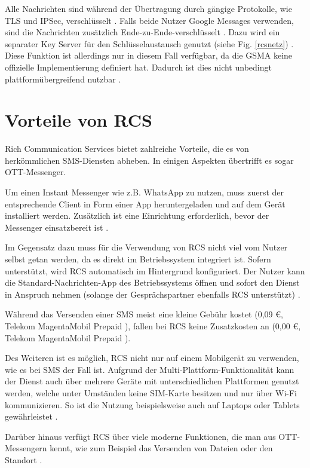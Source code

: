 \documentclass[conference]{IEEEtran}
\begin{document}
Alle Nachrichten sind während der Übertragung durch gängige Protokolle, wie TLS und IPSec, verschlüsselt \cite{uniprof}.
Falls beide Nutzer Google Messages verwenden, sind die Nachrichten zusätzlich Ende-zu-Ende-verschlüsselt \cite{googlemessagessecure}.
Dazu wird ein separater Key Server für den Schlüsselaustausch genutzt (siehe Fig. \ref{rcsnetz}) \cite{5gmsg}.
Diese Funktion ist allerdings nur in diesem Fall verfügbar, da die GSMA keine offizielle Implementierung definiert hat.
Dadurch ist dies nicht unbedingt plattformübergreifend nutzbar \cite{googlemessagessecure}.


\section{Vorteile von RCS}

Rich Communication Services bietet zahlreiche Vorteile, die es von herkömmlichen SMS-Diensten abheben.
In einigen Aspekten übertrifft es sogar OTT-Messenger.

Um einen Instant Messenger wie z.B. WhatsApp zu nutzen, muss zuerst der entsprechende Client in Form einer App heruntergeladen und auf dem Gerät installiert werden.
Zusätzlich ist eine Einrichtung erforderlich, bevor der Messenger einsatzbereit ist \cite{5gmsg,rcsmno}.

Im Gegensatz dazu muss für die Verwendung von RCS nicht viel vom Nutzer selbst getan werden, da es direkt im Betriebssystem integriert ist.
Sofern unterstützt, wird RCS automatisch im Hintergrund konfiguriert.
Der Nutzer kann die Standard-Nachrichten-App des Betriebssystems öffnen und sofort den Dienst in Anspruch nehmen (solange der Gesprächspartner ebenfalls RCS unterstützt) \cite{5gmsg,rcsmno}.

Während das Versenden einer SMS meist eine kleine Gebühr kostet (0,09 €, Telekom MagentaMobil Prepaid \cite{telekomsms}), fallen bei RCS keine Zusatzkosten an (0,00 €, Telekom MagentaMobil Prepaid \cite{telekomrcs}).

Des Weiteren ist es möglich, RCS nicht nur auf einem Mobilgerät zu verwenden, wie es bei SMS der Fall ist.
Aufgrund der Multi-Plattform-Funktionalität kann der Dienst auch über mehrere Geräte mit unterschiedlichen Plattformen genutzt werden, welche unter Umständen keine SIM-Karte besitzen und nur über Wi-Fi kommunizieren.
So ist die Nutzung beispielsweise auch auf Laptops oder Tablets gewährleistet \cite{rcsmno,uniprof}.

Darüber hinaus verfügt RCS über viele moderne Funktionen, die man aus OTT-Messengern kennt, wie zum Beispiel das Versenden von Dateien oder den Standort \cite{wafaq,uniprof}.
\end{document}
